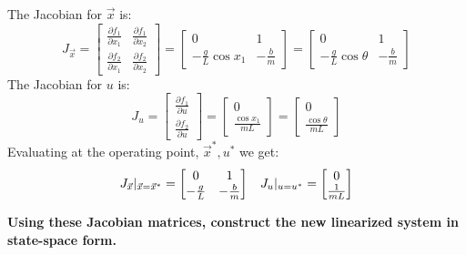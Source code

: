 \begin{enumerate}
{    The Jacobian for $\vec{x}$ is:
    $$J_{\vec{x}} =
    \begin{bmatrix} \frac{\partial f_{1}}{\partial x_{1}} & \frac{\partial f_{1}}{\partial x_{2}} \\
    \frac{\partial f_{2}}{\partial x_{1}} & \frac{\partial f_{2}}{\partial x_{2}}
    \end{bmatrix} = 
    \begin{bmatrix} 0 & 1 \\
    -\frac{g}{L} \cos x_{1} & -\frac{b}{m} 
    \end{bmatrix} = 
    \begin{bmatrix} 0 & 1 \\
    -\frac{g}{L} \cos \theta & -\frac{b}{m} 
    \end{bmatrix}
    $$
    The Jacobian for $u$ is:
    $$J_{u} =
    \begin{bmatrix} \frac{\partial f_{1}}{\partial u} \\ \frac{\partial f_{2}}{\partial u} \end{bmatrix} =
    \begin{bmatrix} 0 \\ \frac{\cos x_{1}}{mL} \end{bmatrix} = 
    \begin{bmatrix} 0 \\ \frac{\cos \theta}{mL} \end{bmatrix}
    $$
    Evaluating at the operating point, $\vec{x}^{*}, u^{*}$ we get:
    $$J_{\vec{x}} |_{\vec{x} = \vec{x}^{*}} =
    \begin{bmatrix} 0 & 1 \\
    -\frac{g}{L} & -\frac{b}{m} 
    \end{bmatrix} \hspace{0.3 cm}
    J_{u} |_{u = u^{*}} =
    \begin{bmatrix} 0 \\ \frac{1}{mL} \end{bmatrix}
    $$
  }

  \qitem \textbf{Using these Jacobian matrices, construct the new linearized system in state-space form.}
  \ws {
    \vspace{125px}
  }


\end{enumerate}
